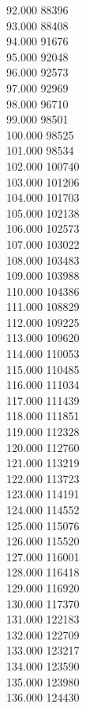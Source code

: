 { 92.000	88396 \\
 93.000	88408 \\
 94.000	91676 \\
 95.000	92048 \\
 96.000	92573 \\
 97.000	92969 \\
 98.000	96710 \\
 99.000	98501 \\
 100.000	98525 \\
 101.000	98534 \\
 102.000	100740 \\
 103.000	101206 \\
 104.000	101703 \\
 105.000	102138 \\
 106.000	102573 \\
 107.000	103022 \\
 108.000	103483 \\
 109.000	103988 \\
 110.000	104386 \\
 111.000	108829 \\
 112.000	109225 \\
 113.000	109620 \\
 114.000	110053 \\
 115.000	110485 \\
 116.000	111034 \\
 117.000	111439 \\
 118.000	111851 \\
 119.000	112328 \\
 120.000	112760 \\
 121.000	113219 \\
 122.000	113723 \\
 123.000	114191 \\
 124.000	114552 \\
 125.000	115076 \\
 126.000	115520 \\
 127.000	116001 \\
 128.000	116418 \\
 129.000	116920 \\
 130.000	117370 \\
 131.000	122183 \\
 132.000	122709 \\
 133.000	123217 \\
 134.000	123590 \\
 135.000	123980 \\
 136.000	124430 \\
}
